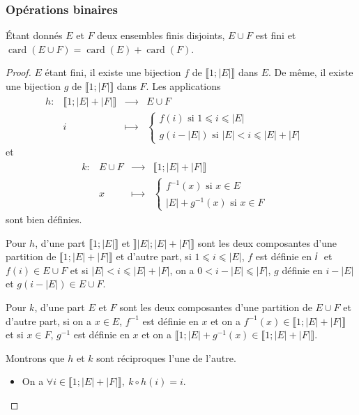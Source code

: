 \subsubsection{Opérations binaires}
\begin{theorem}
Étant donnés \(𝐸\) et \(𝐹\) deux ensembles finis disjoints, \(𝐸∪𝐹\) est fini et
\(\operatorname{card}(𝐸∪𝐹)=\operatorname{card}(𝐸)+\operatorname{card}(𝐹)\).
\end{theorem}
\begin{proof}
\(𝐸\) étant fini, il existe une bijection \(𝑓\) de \(⟦1;|𝐸|⟧\) dans \(𝐸\). De même, il existe une bijection \(𝑔\)
de \(⟦1;|𝐹|⟧\) dans \(𝐹\). Les applications
\begin{equation*}
\begin{matrix}
ℎ:&⟦1;|𝐸|+|𝐹|⟧&⟶&𝐸∪𝐹\phantom{A^A}
\\
&𝑖&⟼&\begin{cases}
𝑓(𝑖)\text{ si }1⩽𝑖⩽|𝐸|
\\
𝑔(𝑖-|𝐸|)\text{ si }|𝐸|<𝑖⩽|𝐸|+|𝐹|\phantom{A^A}
\end{cases}
\end{matrix}
\end{equation*}
et
\begin{equation*}
\begin{matrix}
𝑘:&𝐸∪𝐹&⟶&⟦1;|𝐸|+|𝐹|⟧\phantom{A^A}
\\
&𝑥&⟼&\begin{cases}
𝑓^{-1}(𝑥)\text{ si }𝑥∈𝐸
 \\
|𝐸|+𝑔^{-1}(𝑥)\text{ si }𝑥∈𝐹\phantom{A^A}
 \end{cases}
\end{matrix}
\end{equation*}
sont bien définies.

Pour \(ℎ\), d'une part \(⟦1;|𝐸|⟧\) et \(⟧|𝐸|;|𝐸|+|𝐹|⟧\) sont les deux composantes d'une partition de
\(⟦1;|𝐸|+|𝐹|⟧\) et d'autre part, si \(1⩽𝑖⩽|𝐸|\), \(𝑓\) est définie en 𝑖 \({}\) et \(𝑓(𝑖)∈𝐸∪𝐹\) et si
\(|𝐸|<𝑖⩽|𝐸|+|𝐹|\), on a \(0<𝑖-|𝐸|⩽|𝐹|\), \(𝑔\) définie en \(𝑖-|𝐸|\) et \(𝑔(𝑖-|𝐸|)∈𝐸∪𝐹\).

Pour \(𝑘\), d'une part \(𝐸\) et \(𝐹\) sont les deux composantes d'une partition de \(𝐸∪𝐹\) et d'autre part, si on a
 \(𝑥∈𝐸\), \(𝑓^{-1}\) est définie en \(𝑥\) et on a \(𝑓^{-1}(𝑥)∈⟦1;|𝐸|+|𝐹|⟧\) et si \(𝑥∈𝐹\), \(𝑔^{-1}\) est
définie en \(𝑥\) et on a \(⟦1;|𝐸|+𝑔^{-1}(𝑥)∈⟦1;|𝐸|+|𝐹|⟧\).

Montrons que \(ℎ\) et \(𝑘\) sont réciproques l'une de l'autre.
\begin{itemize}
\item
On a \(∀𝑖∈⟦1;|𝐸|+|𝐹|⟧,\ 𝑘∘ℎ(𝑖)=𝑖\).


\end{itemize}
\end{proof}
